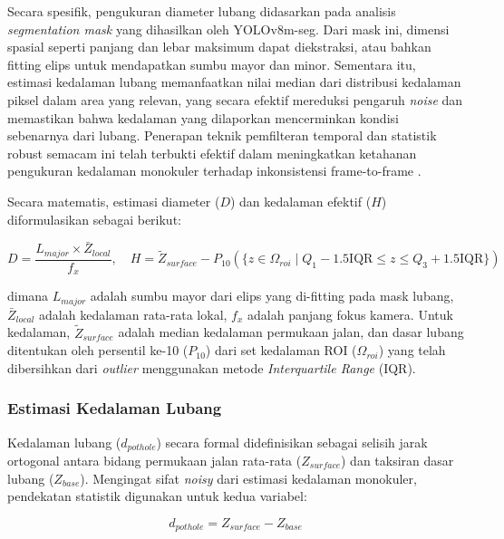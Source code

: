 \documentclass{iopjournal}
\begin{document}
Secara spesifik, pengukuran diameter lubang didasarkan pada analisis \textit{segmentation mask} yang dihasilkan oleh YOLOv8m-seg. Dari mask ini, dimensi spasial seperti panjang dan lebar maksimum dapat diekstraksi, atau bahkan fitting elips untuk mendapatkan sumbu mayor dan minor. Sementara itu, estimasi kedalaman lubang memanfaatkan nilai median dari distribusi kedalaman piksel dalam area yang relevan, yang secara efektif mereduksi pengaruh \textit{noise} dan memastikan bahwa kedalaman yang dilaporkan mencerminkan kondisi sebenarnya dari lubang. Penerapan teknik pemfilteran temporal dan statistik robust semacam ini telah terbukti efektif dalam meningkatkan ketahanan pengukuran kedalaman monokuler terhadap inkonsistensi frame-to-frame \cite{wang2025}.

Secara matematis, estimasi diameter ($D$) dan kedalaman efektif ($H$) diformulasikan sebagai berikut:

\begin{equation}
D = \frac{L_{major} \times \bar{Z}_{local}}{f_x}, \quad H = \tilde{Z}_{surface} - P_{10}(\{z \in \Omega_{roi} \mid Q_1 - 1.5 \text{IQR} \le z \le Q_3 + 1.5 \text{IQR}\})
\end{equation}

dimana $L_{major}$ adalah sumbu mayor dari elips yang di-fitting pada mask lubang, $\bar{Z}_{local}$ adalah kedalaman rata-rata lokal, $f_x$ adalah panjang fokus kamera. Untuk kedalaman, $\tilde{Z}_{surface}$ adalah median kedalaman permukaan jalan, dan dasar lubang ditentukan oleh persentil ke-10 ($P_{10}$) dari set kedalaman ROI ($\Omega_{roi}$) yang telah dibersihkan dari \textit{outlier} menggunakan metode \textit{Interquartile Range} (IQR).


\subsubsection{Estimasi Kedalaman Lubang}
Kedalaman lubang ($d_{pothole}$) secara formal didefinisikan sebagai selisih jarak ortogonal antara bidang permukaan jalan rata-rata ($Z_{surface}$) dan taksiran dasar lubang ($Z_{base}$). Mengingat sifat \textit{noisy} dari estimasi kedalaman monokuler, pendekatan statistik digunakan untuk kedua variabel:

\begin{equation}
d_{pothole} = Z_{surface} - Z_{base}
\end{equation}
\end{document}
